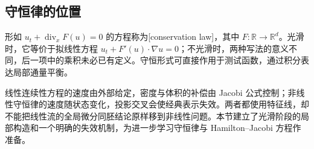 \subsection{守恒律的位置}
\label{b2:subsec:070405}

形如 \(u_t+\operatorname{div}_xF(u)=0\) 的方程称为[conservation law]，其中 \(F:\mathbb R\rightarrow\mathbb R^d\)。光滑时，它等价于拟线性方程 \(u_t+F'(u)\cdot\nabla u=0\)；不光滑时，两种写法的意义不同，后一项中的乘积未必已有定义。守恒形式可直接作用于测试函数，通过积分表达局部通量平衡。

\ProseParagraphBreak

线性连续性方程的速度由外部给定，密度与体积的补偿由 Jacobi 公式控制；非线性守恒律的速度随状态变化，投影交叉会使经典表示失效。两者都使用特征线，却不能把线性流的全局微分同胚结论原样移到非线性问题。本节建立了光滑阶段的局部构造和一个明确的失效机制，为进一步学习守恒律与 Hamilton--Jacobi 方程作准备。
